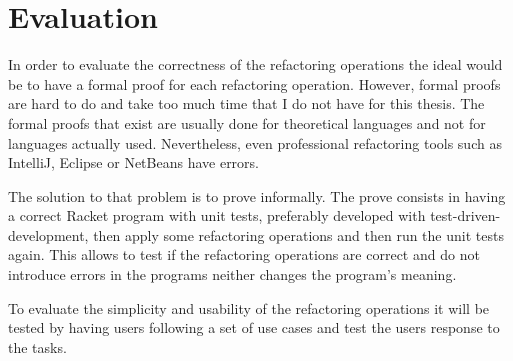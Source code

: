 
% 
% 

\section{Evaluation}


In order to evaluate the correctness of the refactoring operations the ideal would be to have a formal proof for each refactoring operation.
However, formal proofs are hard to do and take too much time that I do not have for this thesis.
The formal proofs that exist are usually done for theoretical languages and not for languages actually used.
Nevertheless, even professional refactoring tools such as IntelliJ, Eclipse or NetBeans have errors. \cite{verbaere2006jungl} 

The solution to that problem is to prove informally. 
The prove consists in having a correct Racket program with unit tests, preferably developed with test-driven-development, then apply some refactoring operations and then run the unit tests again. 
This allows to test if the refactoring operations are correct and do not introduce errors in the programs neither changes the program's meaning.

To evaluate the simplicity and usability of the refactoring operations it will be tested by having users following a set of use cases and test the users response to the tasks.